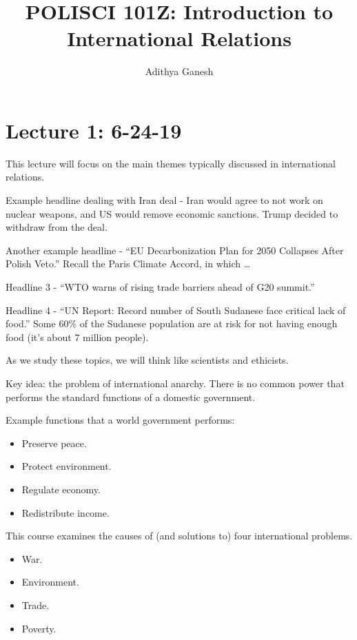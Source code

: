 \documentclass{article}
\title{POLISCI 101Z: Introduction to International Relations}
\author{Adithya Ganesh}
\begin{document}
\maketitle

\tableofcontents

\section{Lecture 1: 6-24-19}

This lecture will focus on the main themes typically discussed in international relations.

Example headline dealing with Iran deal - Iran would agree to not work on nuclear weapons, and US would remove economic sanctions.  Trump decided to withdraw from the deal.

Another example headline - ``EU Decarbonization Plan for 2050 Collapses After Polish Veto.''  Recall the Paris Climate Accord, in which {\ldots}

Headline 3 - ``WTO warns of rising trade barriers ahead of G20 summit.''

Headline 4 - ``UN Report: Record number of South Sudanese face critical lack of food.''  Some 60\% of the Sudanese population are at risk for not having enough food (it's about 7 million people).

As we study these topics, we will think like scientists and ethicists.

Key idea: the problem of international anarchy.  There is no common power that performs the standard functions of a domestic government.

Example functions that a world government performs:

\begin{itemize}
  \item Preserve peace.
  \item Protect environment.
  \item Regulate economy.
  \item Redistribute income.
\end{itemize}

This course examines the causes of (and solutions to) four international problems.

\begin{itemize}
  \item War.
  \item Environment.
  \item Trade.
  \item Poverty.
\end{itemize}
\end{document}
